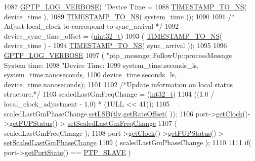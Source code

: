 \begin{DoxyCode}
{{1087     \hyperlink{gptp__log_8hpp_add03384a2a8099b27e07d041cce77e6f}{GPTP\_LOG\_VERBOSE}( \textcolor{stringliteral}{"Device Time = %
1088               \hyperlink{ieee1588_8hpp_a0f6cecd8adce4a7314f084f3ead49999}{TIMESTAMP\_TO\_NS}( device\_time ),
1089               \hyperlink{ieee1588_8hpp_a0f6cecd8adce4a7314f084f3ead49999}{TIMESTAMP\_TO\_NS}( system\_time ));
1090 
1091     \textcolor{comment}{/* Adjust local\_clock to correspond to sync\_arrival */}
1092     device\_sync\_time\_offset = (\hyperlink{parse_8c_a6eb1e68cc391dd753bc8ce896dbb8315}{uint32\_t})
1093         ( \hyperlink{ieee1588_8hpp_a0f6cecd8adce4a7314f084f3ead49999}{TIMESTAMP\_TO\_NS}( device\_time ) -
1094           \hyperlink{ieee1588_8hpp_a0f6cecd8adce4a7314f084f3ead49999}{TIMESTAMP\_TO\_NS}( sync\_arrival ));
1095 
1096     \hyperlink{gptp__log_8hpp_add03384a2a8099b27e07d041cce77e6f}{GPTP\_LOG\_VERBOSE}
1097     ( \textcolor{stringliteral}{"ptp\_message::FollowUp::processMessage System time: %
1098       \textcolor{stringliteral}{"Device Time: %
1099       system\_time.seconds\_ls, system\_time.nanoseconds,
1100       device\_time.seconds\_ls, device\_time.nanoseconds);
1101 
1102     \textcolor{comment}{/*Update information on local status structure.*/}
1103     scaledLastGmFreqChange = (\hyperlink{parse_8c_a37994e3b11c72957c6f454c6ec96d43d}{int32\_t})
1104         ((1.0 / local\_clock\_adjustment - 1.0) * (1ULL << 41));
1105     scaledLastGmPhaseChange.\hyperlink{classscaled_ns_af1ae2f0b6b9b14bbddc9a2d718b2934a}{setLSB}(\hyperlink{class_p_t_p_message_follow_up_adb3aa00a5c7072f30af7374ea54c158c}{tlv}.\hyperlink{class_follow_up_t_l_v_a2a33a47008ba66b8d4c85265f0b825d3}{getRateOffset}( ));
1106     port->\hyperlink{class_common_port_ab8e59ecfb51ec14e166bc8bfc872b1ef}{getClock}()->\hyperlink{class_i_e_e_e1588_clock_a0f9e3da79c0433d8ddeb984875c145c6}{getFUPStatus}()->
      \hyperlink{class_follow_up_t_l_v_a00695cdf1b36c99d1b5cc6edd5f69662}{setScaledLastGmFreqChange}
1107         ( scaledLastGmFreqChange );
1108     port->\hyperlink{class_common_port_ab8e59ecfb51ec14e166bc8bfc872b1ef}{getClock}()->\hyperlink{class_i_e_e_e1588_clock_a0f9e3da79c0433d8ddeb984875c145c6}{getFUPStatus}()->
      \hyperlink{class_follow_up_t_l_v_ab7e977e03240f3cf8c280ec32a5d62bb}{setScaledLastGmPhaseChange}
1109         ( scaledLastGmPhaseChange );
1110 
1111     \textcolor{keywordflow}{if}( port->\hyperlink{class_common_port_aa4182d914fdb9a27fb875d8495e0289c}{getPortState}() == \hyperlink{ptptypes_8hpp_a679431f1afc75d7bb9e972c022e53672a55a1a2eb4b93c65e3bba86278510cb04}{PTP\_SLAVE} )
}}}}}
\end{DoxyCode}
